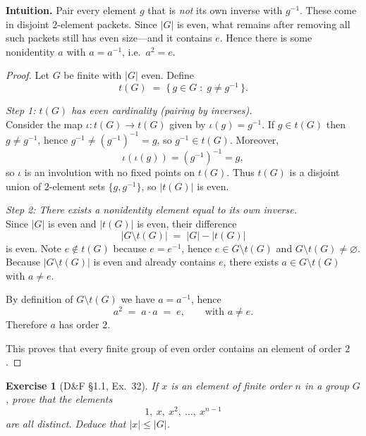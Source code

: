 \documentclass[12pt]{article}
\newtheorem{exercise}[theorem]{Exercise}
\theoremstyle{definition}
\begin{document}
\dotfill

\noindent
\textbf{Intuition.}
Pair every element $g$ that is \emph{not} its own inverse with $g^{-1}$.
These come in disjoint $2$-element packets. Since $|G|$ is even, what
remains after removing all such packets still has even size—and it contains $e$.
Hence there is some nonidentity $a$ with $a=a^{-1}$, i.e.\ $a^2=e$.

\dotfill

\begin{proof}
Let $G$ be finite with $|G|$ even. Define
\[
t(G)\;=\;\{\,g\in G\;:\; g\neq g^{-1}\,\}.
\]

\noindent\emph{Step 1: $t(G)$ has even cardinality (pairing by inverses).}\\
Consider the map $\iota:t(G)\to t(G)$ given by $\iota(g)=g^{-1}$.
If $g\in t(G)$ then $g\neq g^{-1}$, hence $g^{-1}\neq (g^{-1})^{-1}=g$, so $g^{-1}\in t(G)$.
Moreover,
\[
\iota(\iota(g))=(g^{-1})^{-1}=g,
\]
so $\iota$ is an involution with no fixed points on $t(G)$. Thus $t(G)$ is a disjoint union of $2$-element sets $\{g,g^{-1}\}$, so $|t(G)|$ is even.

\dotfill

\noindent\emph{Step 2: There exists a nonidentity element equal to its own inverse.}\\
Since $|G|$ is even and $|t(G)|$ is even, their difference
\[
|G\setminus t(G)| \;=\; |G|-|t(G)|
\]
is even. Note $e\notin t(G)$ because $e=e^{-1}$, hence $e\in G\setminus t(G)$ and $G\setminus t(G)\neq\varnothing$.
Because $|G\setminus t(G)|$ is even and already contains $e$, there exists $a\in G\setminus t(G)$ with $a\neq e$.

By definition of $G\setminus t(G)$ we have $a=a^{-1}$, hence
\[
a^2 \;=\; a\cdot a \;=\; e,
\qquad\text{with } a\neq e.
\]
Therefore $a$ has order $2$.

\dotfill

This proves that every finite group of even order contains an element of order $2$.
\end{proof}

\newpage

\begin{exercise}[D\&F §1.1, Ex.~32]
If $x$ is an element of finite order $n$ in a group $G$, prove that the elements
\[
1,\ x,\ x^2,\ \dots,\ x^{n-1}
\]
are all distinct. Deduce that $|x|\le |G|$.
\end{exercise}

\dotfill
\end{document}
